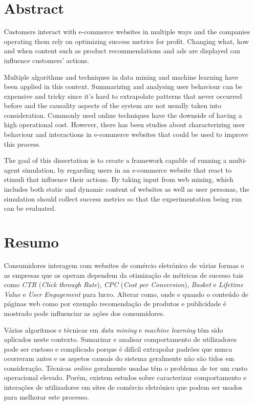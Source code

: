 \chapter*{Abstract}


Customers interact with e-commerce websites in multiple ways and the
companies operating them rely on optimizing success metrics for profit. 
Changing what, how and when content such as product recommendations and ads are 
displayed can influence customers' actions.

Multiple algorithms and techniques in data mining and machine learning
have been applied in this context. Summarizing and analysing user
behaviour can be expensive and tricky since it's hard to extrapolate
patterns that never occurred before and the causality aspects of the
system are not usually taken into consideration. Commonly used online
techniques have the downside of having a high operational cost. However, there 
has been studies about characterizing user behaviour and interactions in 
e-commerce websites that could be used to improve this process.

The goal of this dissertation is to create a framework capable of running
a multi-agent simulation, by regarding users in an e-commerce website that
react to stimuli that influence their actions. By taking input from web mining, 
which includes both static and dynamic content of websites as well as user 
personas, the simulation should collect success metrics so that the 
experimentation being run can be evaluated.

\chapter*{Resumo}

Consumidores interagem com websites de comércio eletrónico de várias formas e 
as empresas que os operam dependem da otimização de métricas de sucesso tais 
como \textit{CTR} (\textit{Click through Rate}), \textit{CPC} (\textit{Cost per 
Conversion}), \textit{Basket} e \textit{Lifetime Value} e \textit{User 
Engagement} para lucro. Alterar como, onde e quando o conteúdo de páginas web 
como por exemplo recomendação de produtos e publicidade é mostrado pode 
influenciar as ações dos consumidores.

Vários algoritmos e técnicas em \textit{data mining} e \textit{machine 
learning} têm sido aplicados neste contexto. Sumarizar e analisar comportamento 
de utilizadores pode ser custoso e complicado porque é difícil extrapolar 
padrões que nunca ocorreram antes e os aspetos causais do sistema geralmente 
não são tidos em consideração. Técnicas \textit{online} geralmente usadas têm o 
problema de ter um custo operacional elevado. Porém, existem estudos sobre 
caracterizar comportamento e interações de utilizadores em sites de comércio 
eletrónico que podem ser usados para melhorar este processo.

